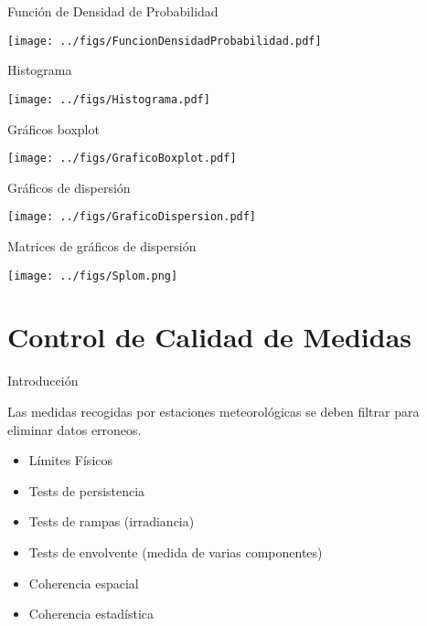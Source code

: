 \documentclass[aspectratio=169, usenames,svgnames,dvipsnames]{beamer}
\begin{document}
\begin{frame}[label={sec:org2fc00a1}]{Función de Densidad de Probabilidad}
\begin{center}
\texttt{[image: ../figs/FuncionDensidadProbabilidad.pdf]}
\end{center}
\end{frame}

\begin{frame}[label={sec:orgcbdefc1}]{Histograma}
\begin{center}
\texttt{[image: ../figs/Histograma.pdf]}
\end{center}
\end{frame}


\begin{frame}[label={sec:org904f9c9}]{Gráficos boxplot}
\begin{center}
\texttt{[image: ../figs/GraficoBoxplot.pdf]}
\end{center}
\end{frame}


\begin{frame}[label={sec:org5adc334}]{Gráficos de dispersión}
\begin{center}
\texttt{[image: ../figs/GraficoDispersion.pdf]}
\end{center}
\end{frame}


\begin{frame}[label={sec:orge144d98}]{Matrices de gráficos de dispersión}
\begin{center}
\texttt{[image: ../figs/Splom.png]}
\end{center}
\end{frame}

\section{Control de Calidad de Medidas}
\label{sec:orgfca856a}

\begin{frame}[label={sec:orgccd56ed}]{Introducción}
\begin{block}{Las medidas recogidas por estaciones meteorológicas se deben filtrar para eliminar datos erroneos.}
\begin{itemize}
\item Límites Físicos
\item Tests de persistencia
\item Tests de rampas (irradiancia)
\item Tests de envolvente (medida de varias componentes)
\item Coherencia espacial
\item Coherencia estadística
\end{itemize}
\end{block}
\end{frame}
\end{document}
